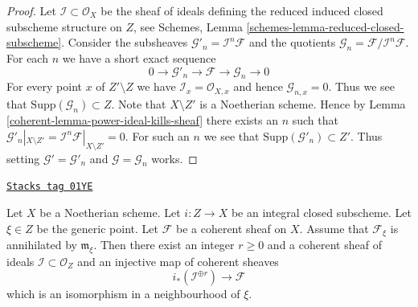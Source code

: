 \begin{proof}

Let $\mathcal{I} \subset \mathcal{O}_X$ be the sheaf of ideals
defining the reduced induced closed subscheme structure on $Z$, see
Schemes, Lemma \ref{schemes-lemma-reduced-closed-subscheme}.
Consider the subsheaves
$\mathcal{G}'_n = \mathcal{I}^n\mathcal{F}$ and the
quotients $\mathcal{G}_n = \mathcal{F}/\mathcal{I}^n\mathcal{F}$.
For each $n$ we have a short exact sequence
$$
0 \to \mathcal{G}'_n \to \mathcal{F} \to \mathcal{G}_n \to 0
$$
For every point $x$ of $Z' \setminus Z$ we have
$\mathcal{I}_x = \mathcal{O}_{X, x}$
and hence $\mathcal{G}_{n, x} = 0$. Thus we see that
$\text{Supp}(\mathcal{G}_n) \subset Z$. Note that $X \setminus Z'$
is a Noetherian scheme. Hence by Lemma \ref{coherent-lemma-power-ideal-kills-sheaf}
there exists an $n$ such that
$\mathcal{G}'_n|_{X \setminus Z'} =
\mathcal{I}^n\mathcal{F}|_{X \setminus Z'} = 0$.
For such an $n$ we see that $\text{Supp}(\mathcal{G}'_n) \subset Z'$.
Thus setting
$\mathcal{G}' = \mathcal{G}'_n$ and $\mathcal{G} = \mathcal{G}_n$
works.
\end{proof}

\begin{lemma}
\label{coherent-lemma-prepare-filter-irreducible}
\href{https://stacks.math.columbia.edu/tag/01YE}{\texttt{Stacks tag 01YE}}

Let $X$ be a Noetherian scheme.
Let $i : Z \to X$ be an integral closed subscheme.
Let $\xi \in Z$ be the generic point.
Let $\mathcal{F}$ be a coherent sheaf on $X$.
Assume that $\mathcal{F}_\xi$ is annihilated by
$\mathfrak m_\xi$. Then there exist an integer
$r \geq 0$ and a coherent sheaf of ideals $\mathcal{I} \subset \mathcal{O}_Z$
and an injective map of coherent sheaves
$$
i_*\left(\mathcal{I}^{\oplus r}\right) \to \mathcal{F}
$$
which is an isomorphism in a neighbourhood of $\xi$.
\end{lemma}

